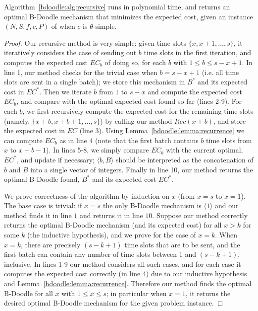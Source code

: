 \begin{theorem} \label{bdoodle:thm:recursive_algo}
Algorithm~\ref{bdoodle:alg:recursive} runs in polynomial time, and returns an optimal B-Doodle mechanism that minimizes the expected cost, given an instance $(N, S, f, c, P)$ of \BDPs when $c$ is $\theta$-simple.
\end{theorem}
\begin{proof}
Our recursive method is very simple: given time slots $\{x, x+1, \dots, s\}$, it iteratively considers the case of sending out $b$ time slots in the first iteration, and computes the expected cost $EC_b$ of doing so, for each $b$ with $1 \leq b \leq s-x+1$.  In line 1, our method checks for the trivial case when $b = s-x+1$ (i.e. all time slots are sent in a single batch); we store this mechanism in $B^*$ and its expected cost in $EC^*$. Then we iterate $b$ from $1$ to $s-x$ and compute the expected cost $EC_b$, and compare with the optimal expected cost found so far (lines 2-9). For each $b$, we first recursively compute the expected cost for the remaining time slots (namely, $\{x+b, x+b+1, \dots, s\}$) by calling our method $Rec(x+b)$, and store the expected cost in $EC$ (line 3). Using Lemma~\ref{bdoodle:lemma:recurrence} we can compute $EC_b$ as in line 4 (note that the first batch contains $b$ time slots from $x$ to $x+b-1$). In lines 5-8, we simply compare $EC_b$ with the current optimal, $EC^*$, and update if necessary; $\langle b, B \rangle$ should be interpreted as the concatenation of $b$ and $B$ into a single vector of integers. Finally in line 10, our method returns the optimal B-Doodle found, $B^*$ and its expected cost $EC^*$. 

We prove correctness of the algorithm by induction on $x$ (from $x = s$ to $x = 1$). The base case is trivial: if $x = s$ the only B-Doodle mechanism is $\langle 1 \rangle$ and our method finds it in line $1$ and returns it in line $10$. Suppose our method correctly returns the optimal B-Doodle mechanism (and its expected cost) for all $x > k$ for some $k$ (the inductive hypothesis), and we prove for the case of $x = k$. When $x = k$, there are precisely $(s-k+1)$ time slots that are to be sent, and the first batch can contain any number of time slots between $1$ and $(s-k+1)$, inclusive. In lines 1-9 our method considers all such cases, and for each case it computes the expected cost correctly (in line 4) due to our inductive hypothesis and Lemma~\ref{bdoodle:lemma:recurrence}. Therefore our method finds the optimal B-Doodle for all $x$ with $1 \leq x \leq s$; in particular when $x = 1$, it returns the desired optimal B-Doodle mechanism for the given problem instance.


\end{proof}
